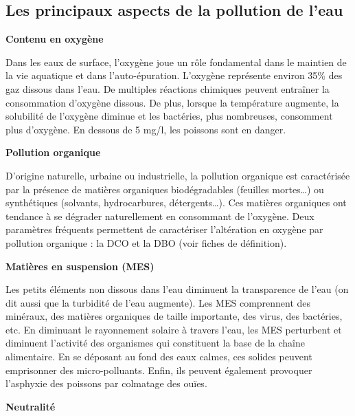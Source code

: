 \subsection{Les principaux aspects de la pollution de l'eau}

\vspace{0.3cm}
\textbf{Contenu en oxygène}
\vspace{0.3cm}

Dans les eaux de surface, l’oxygène joue un rôle fondamental dans le maintien de la vie aquatique et dans l’auto-épuration. L’oxygène représente environ 35\% des gaz dissous dans l’eau. De multiples réactions chimiques peuvent entraîner la consommation d’oxygène dissous. De plus, lorsque la température augmente, la solubilité de l’oxygène diminue et les bactéries, plus nombreuses, consomment plus d’oxygène. En dessous de 5 mg/l, les poissons sont en danger.

\vspace{0.3cm}
\textbf{Pollution organique}
\vspace{0.3cm}

D’origine naturelle, urbaine ou industrielle, la pollution organique est caractérisée par la 
présence de matières organiques biodégradables (feuilles mortes…) ou synthétiques (solvants, hydrocarbures, détergents…). Ces matières organiques ont tendance à se dégrader 
naturellement en consommant de l’oxygène.
Deux paramètres fréquents permettent de caractériser l’altération en oxygène par pollution organique : la DCO et la DBO (voir fiches de définition).

\vspace{0.3cm}
\textbf{Matières en suspension (MES)}
\vspace{0.3cm}

Les petits éléments non dissous dans l’eau diminuent la transparence de l’eau (on dit aussi que la turbidité de l’eau augmente). Les MES comprennent des minéraux, des matières 
organiques de taille importante, des virus, des bactéries, etc. En diminuant le rayonnement solaire à travers l’eau, les MES perturbent et diminuent l’activité des organismes qui constituent la base de la chaîne alimentaire. En se déposant au fond des eaux calmes, ces solides peuvent emprisonner des micro-polluants. Enfin, ils peuvent également provoquer l’asphyxie des poissons par colmatage des ouïes.

\vspace{0.3cm}
\textbf{Neutralité}
\vspace{0.3cm}

